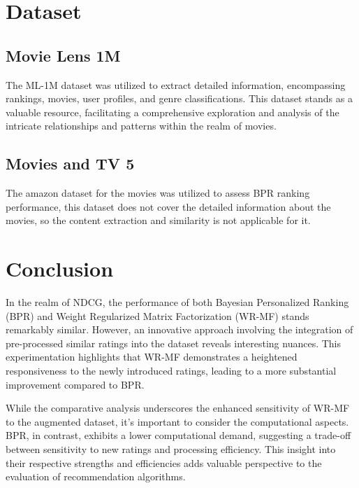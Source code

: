 \documentclass[journal]{IEEEtran}
\begin{document}
\section{Dataset}

\subsection*{Movie Lens 1M}
The ML-1M dataset was utilized to extract detailed information, encompassing rankings, movies, user profiles, and genre classifications. 
This dataset stands as a valuable resource, facilitating a comprehensive exploration and analysis of the intricate relationships and 
patterns within the realm of movies.

\subsection*{Movies and TV 5}
The amazon dataset for the movies was utilized to assess BPR ranking performance, this dataset does not cover the detailed information
about the movies, so the content extraction and similarity is not applicable for it.

\section{Conclusion}
In the realm of NDCG, the performance of both Bayesian Personalized Ranking (BPR) and Weight Regularized Matrix Factorization (WR-MF) 
stands remarkably similar. However, an innovative approach involving the integration of pre-processed similar ratings into the 
dataset reveals interesting nuances. This experimentation highlights that WR-MF demonstrates a heightened responsiveness to the 
newly introduced ratings, leading to a more substantial improvement compared to BPR.

While the comparative analysis underscores the enhanced sensitivity of WR-MF to the augmented dataset, it's important to consider 
the computational aspects. BPR, in contrast, exhibits a lower computational demand, suggesting a trade-off between sensitivity to 
new ratings and processing efficiency. This insight into their respective strengths and efficiencies adds valuable perspective to 
the evaluation of recommendation algorithms.
\end{document}
